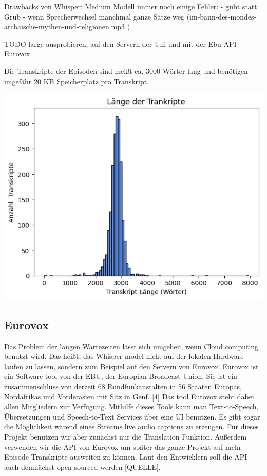 Drawbacks von Whisper:
Medium Modell immer noch einige Fehler: 
- gubt statt Grub
- wenn Sprecherwechsel manchmal ganze Sätze weg (im-bann-des-mondes-archaische-mythen-und-religionen.mp3	)

TODO large ausprobieren, auf den Servern der Uni und mit der Ebu API
Eurovox


Die Transkripte der Episoden sind meißt ca. 3000 Wörter lang und benötigen ungefähr 20 KB Speicherplatz pro Transkript.

\includegraphics[width=\linewidth]{figures/transcript_length.png}


\subsection{Eurovox}

Das Problem der langen Wartezeiten lässt sich umgehen, wenn Cloud computing benutzt wird.
Das heißt, das Whisper model nicht auf der lokalen Hardware laufen zu lassen, sondern zum Beispiel auf den Servern von Eurovox. 
Eurovox ist ein Software tool von der EBU, der Europian Broadcast Union. 
Sie ist ein zusammenschluss von derzeit 68 Rundfunkanstalten in 56 Staaten Europas, Nordafrikas und Vorderasien mit Sitz in Genf. [4] 
Das tool Eurovox steht dabei allen Mitgliedern zur Verfügung.  
Mithilfe dieses Tools kann man Text-to-Speech, Übersetzungen und Speech-to-Text Services über eine UI benutzen. 
Es gibt sogar die Möglichkeit wärend eines Streams live audio captions zu erzeugen. 
Für dieses Projekt benutzen wir aber zunächst nur die Translation Funktion. 
Außerdem verwenden wir die API von Eurovox um später das ganze Projekt auf mehr Episode Transkripte ausweiten zu können. 
Laut den Entwicklern soll die API auch demnächst open-sourced werden [QUELLE].

